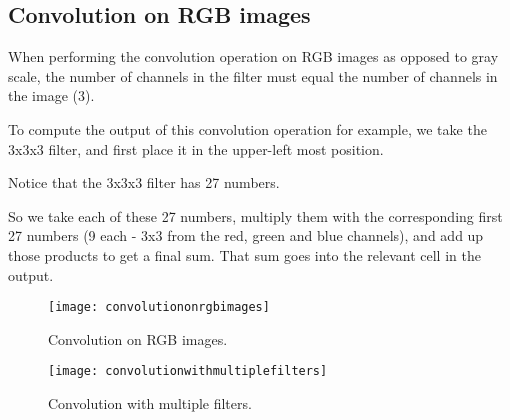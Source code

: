 	\subsection{Convolution on RGB images}
	\begin{bulletedlist}
		\item When performing the convolution operation on RGB images as opposed to gray scale, the number of channels in the filter must equal the number of channels in the image (3).
		\item To compute the output of this convolution operation for example, we take the 3x3x3 filter, and first place it in the upper-left most position.
		\item Notice that the 3x3x3 filter has 27 numbers.
		\item So we take each of these 27 numbers, multiply them with the corresponding first 27 numbers (9 each - 3x3 from the red, green and blue channels), and add up those products to get a final sum.  That sum goes into the relevant cell in the output.
	\end{bulletedlist}

	\begin{figure}[h]
		\centering
		\texttt{[image: convolutiononrgbimages]}
		\caption[Convolution on RGB images]{Convolution on RGB images.}
		\label{fig:convolutiononrgbimages}
	\end{figure}
	\begin{figure}[h]
		\centering
		\texttt{[image: convolutionwithmultiplefilters]}
		\caption[Convolution with multiple filters]{Convolution with multiple filters.}
		\label{fig:convolutionwithmultiplefilters}
	\end{figure}


